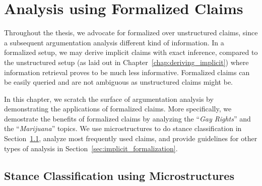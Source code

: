 \chapter{Analysis using Formalized Claims}
\label{chap:analysis}


Throughout the thesis, we advocate for formalized over unstructured claims,
since a subsequent argumentation analysis different kind of information.  In a
formalized setup, we may derive implicit claims with exact inference, compared
to the unstructured setup (as laid out in Chapter~\ref{chap:deriving_implicit})
where information retrieval proves to be much less informative.  Formalized
claims can be easily queried and are not ambiguous as unstructured claims might
be. 

% 


In this chapter, we scratch the surface of argumentation analysis by
demonstrating the applications of formalized claims.  More specifically, we
demostrate the benefits of formalized claims by analyzing the ``\emph{Gay
Rights}'' and the ``\emph{Marijuana}'' topics. 
We use microstructures to do stance classification in
Section~\ref{sec:stance_micro}, analyze most frequently used
claims, and provide guidelines for other types
of analysis in Section~\ref{sec:implicit_formalization}. 


\section{Stance Classification using Microstructures}
\label{sec:stance_micro}

